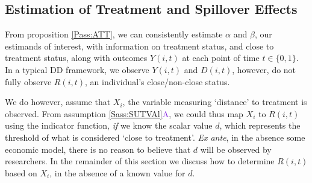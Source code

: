 \documentclass{article}
\newcommand{\asref}[2]{\ref{#1}{\textcolor{BlueViolet}{#2}}}
\begin{document}
\begin{spacing}{1.1}
\subsection{Estimation of Treatment and Spillover Effects}
From proposition \ref{Pass:ATT}, we can consistently estimate $\alpha$
and $\beta$, our estimands of interest, with information on treatment
status, and close to treatment status, along with outcomes $Y(i,t)$ at
each point of time $t\in\{0,1\}$.  In a typical DD framework, we
observe $Y(i,t)$ and $D(i,t)$, however, do not fully observe $R(i,t)$,
an individual's close/non-close status.

We do however, assume that $X_i$, the variable measuring `distance' to
treatment is observed.  From assumption \asref{Sass:SUTVAl}{A}, we could
thus map $X_i$ to $R(i,t)$ using the indicator function, \emph{if} we
know the scalar value $d$, which represents the threshold of what is
considered `close to treatment'.  \emph{Ex ante}, in the absence some
economic model, there is no reason to believe that $d$ will be
observed by researchers.  In the remainder of this section we discuss
how to determine $R(i,t)$ based on $X_i$, in the absence of a known
value for $d$.


\end{spacing}
\end{document}

